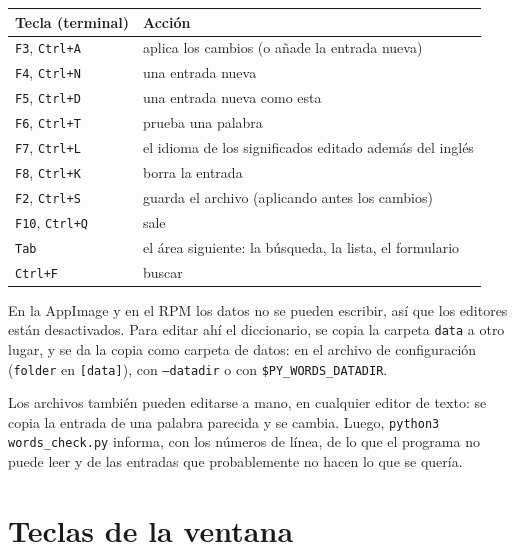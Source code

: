 \documentclass[12pt,
              article,
              oneside
              ]{memoir}
\newcommand*{\key}[1]{\texttt{#1}}
\begin{document}
%
\begin{longtable}{@{}>{\raggedright}p{}p{}@{}}
\toprule
Tecla (terminal) & Acción\\
\midrule
\endhead
\key{F3}, \key{Ctrl+A} & aplica los cambios (o añade la entrada nueva)\\
\key{F4}, \key{Ctrl+N} & una entrada nueva\\
\key{F5}, \key{Ctrl+D} & una entrada nueva como esta\\
\key{F6}, \key{Ctrl+T} & prueba una palabra\\
\key{F7}, \key{Ctrl+L} & el idioma de los significados editado además del inglés\\
\key{F8}, \key{Ctrl+K} & borra la entrada\\
\key{F2}, \key{Ctrl+S} & guarda el archivo (aplicando antes los cambios)\\
\key{F10}, \key{Ctrl+Q} & sale\\
\key{Tab} & el área siguiente: la búsqueda, la lista, el formulario\\
\key{Ctrl+F} & buscar\\
\bottomrule
\end{longtable}

\noindent{}%
En la AppImage y en el RPM los datos no se pueden escribir, así que los
editores están desactivados. Para editar ahí el diccionario, se copia la
carpeta \texttt{data} a otro lugar, y se da la copia como carpeta de
datos: en el archivo de configuración (\texttt{folder} en
\texttt{[data]}), con \texttt{--datadir} o con
\texttt{\$PY\_WORDS\_DATADIR}.

%
Los archivos también pueden editarse a mano, en cualquier editor de
texto: se copia la entrada de una palabra parecida y se cambia. Luego,
\texttt{python3 words\_check.py} informa, con los números de línea, de lo
que el programa no puede leer y de las entradas que probablemente no hacen
lo que se quería.

\section{Teclas de la ventana}
\label{sec:keys}
\end{document}
